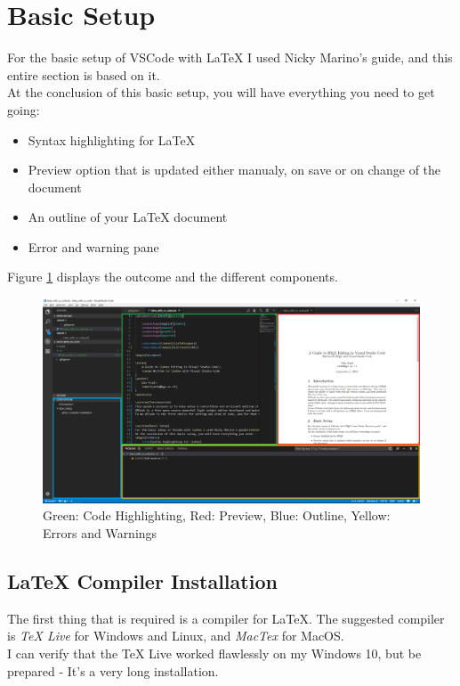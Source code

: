 \documentclass{article}
\newcommand{\latex}{\LaTeX\xspace}
\begin{document}
\section{Basic Setup}
For the basic setup of VSCode with \latex I used Nicky Marino's guide\footnotemark[3], and this entire section is based on it.\\
At the conclusion of this basic setup, you will have everything you need to get going:
\begin{itemize}
	\item{Syntax highlighting for \latex}
	\item{Preview option that is updated either manualy, on save or on change of the document}
	\item{An outline of your \latex document}
	\item{Error and warning pane}
\end{itemize}
Figure \ref{fig:vscode_with_latex_highlights} displays the outcome and the different components.
\begin{figure}
	\includegraphics[width=\linewidth]{../resources/vscode_with_latex_highlights.png}
	\caption{Green: Code Highlighting, Red: Preview, Blue: Outline, Yellow: Errors and Warnings}
	\label{fig:vscode_with_latex_highlights}
\end{figure}

\subsection{\latex Compiler Installation}
The first thing that is required is a compiler for \latex. The suggested compiler is \emph{TeX Live} for Windows and Linux, and \emph{MacTex} for MacOS.\\
I can verify that the TeX Live worked flawlessly on my Windows 10, but be prepared - It's a very long installation.
\end{document}
